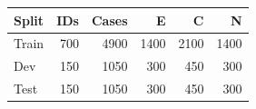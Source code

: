 \begin{tabular}{lrrrrr}
\toprule
Split & IDs & Cases & E & C & N \\
\midrule
Train & 700 & 4900 & 1400 & 2100 & 1400 \\
Dev & 150 & 1050 & 300 & 450 & 300 \\
Test & 150 & 1050 & 300 & 450 & 300 \\
\bottomrule
\end{tabular}
